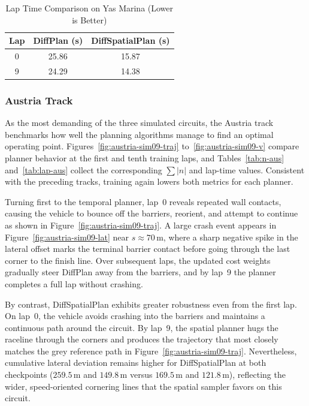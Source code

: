 \begin{table}[ht]
    \centering
    \caption{Lap Time Comparison on Yas Marina (Lower is Better)}
    \label{tab:lap-yas}
    \begin{tabular}{ccc}
        \hline
        Lap & DiffPlan (s) & DiffSpatialPlan (s)\\
        \hline
        0   &  25.86  &   15.87 \\
        9   &   24.29 &  14.38 \\
        \hline
    \end{tabular}
\end{table}

\subsubsection{Austria Track}

As the most demanding of the three simulated circuits, the Austria track benchmarks how well the planning algorithms manage to find an optimal operating point.
Figures~\ref{fig:austria-sim09-traj} to~\ref{fig:austria-sim09-v} compare planner behavior at the first and tenth training laps, and Tables~\ref{tab:n-aus} and~\ref{tab:lap-aus} collect the corresponding $\sum|n|$ and lap-time values.
Consistent with the preceding tracks, training again lowers both metrics for each planner.

Turning first to the temporal planner, lap~0 reveals repeated wall contacts, causing the vehicle to bounce off the barriers, reorient, and attempt to continue as shown in Figure~\ref{fig:austria-sim09-traj}.
A large crash event appears in Figure~\ref{fig:austria-sim09-lat} near $s \approx 70$\,m, where a sharp negative spike in the lateral offset marks the terminal barrier contact before going through the last corner to the finish line.
Over subsequent laps, the updated cost weights gradually steer DiffPlan away from the barriers, and by lap~9 the planner completes a full lap without crashing.

By contrast, DiffSpatialPlan exhibits greater robustness even from the first lap.
On lap~0, the vehicle avoids crashing into the barriers and maintains a continuous path around the circuit.
By lap~9, the spatial planner hugs the raceline through the corners and produces the trajectory that most closely matches the grey reference path in Figure~\ref{fig:austria-sim09-traj}.
Nevertheless, cumulative lateral deviation remains higher for DiffSpatialPlan at both checkpoints ($259.5$\,m and $149.8$\,m versus $169.5$\,m and $121.8$\,m), reflecting the wider, speed-oriented cornering lines that the spatial sampler favors on this circuit.

